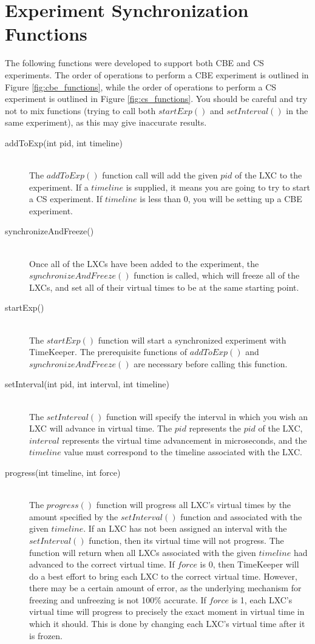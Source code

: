 \section{Experiment Synchronization Functions}
The following functions were developed to support both CBE and CS experiments. The order of operations to perform a CBE experiment is outlined in Figure \ref{fig:cbe_functions}, while the order of operations to perform a CS experiment is outlined in Figure \ref{fig:cs_functions}. You should be careful and try not to mix functions (trying to call both $startExp()$ and $setInterval()$ in the same experiment), as this may give inaccurate results.
\begin{description}
\item[addToExp(int pid, int timeline) ] \hfill \\
The $addToExp()$ function call will add the given $pid$ of the LXC to the experiment. If a $timeline$ is supplied, it means you are going to try to start a CS experiment. If $timeline$ is less than 0, you will be setting up a CBE experiment. 
\item[synchronizeAndFreeze() ] \hfill \\
Once all of the LXCs have been added to the experiment, the $synchronizeAndFreeze()$ function is called, which will freeze all of the LXCs, and set all of their virtual times to be at the same starting point. 
\item[startExp()] \hfill \\
The $startExp()$ function will start a synchronized experiment with TimeKeeper. The prerequisite functions of $addToExp()$ and $synchronizeAndFreeze()$ are necessary before calling this function.
\item[setInterval(int pid, int interval, int timeline) ] \hfill \\
The $setInterval()$ function will specify the interval in which you wish an LXC will advance in virtual time. The $pid$ represents the $pid$ of the LXC, $interval$ represents the virtual time advancement in microseconds, and the $timeline$ value must correspond to the timeline associated with the LXC. 
\item[progress(int timeline, int force) ] \hfill \\
The $progress()$ function will progress all LXC's virtual times by the amount specified by the $setInterval()$ function and associated with the given $timeline$. If an LXC has not been assigned an interval with the $setInterval()$ function, then its virtual time will not progress. The function will return when all LXCs associated with the given $timeline$ had advanced to the correct virtual time. If $force$ is 0, then TimeKeeper will do a best effort to bring each LXC to the correct virtual time. However, there may be a certain amount of error, as the underlying mechanism for freezing and unfreezing is not 100\% accurate. If $force$ is 1, each LXC's virtual time will progress to precisely the exact moment in virtual time in which it should. This is done by changing each LXC's virtual time after it is frozen.

\end{description}
